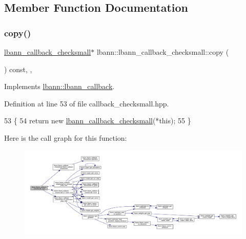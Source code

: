 \subsection{Member Function Documentation}
\mbox{\label{classlbann_1_1lbann__callback__checksmall_ae0601cd90b165049063783d4d501ffde}} 
\subsubsection{\texorpdfstring{copy()}{copy()}}
{\footnotesize\ttfamily \hyperlink{classlbann_1_1lbann__callback__checksmall}{lbann\+\_\+callback\+\_\+checksmall}$\ast$ lbann\+::lbann\+\_\+callback\+\_\+checksmall\+::copy (\begin{DoxyParamCaption}{ }\end{DoxyParamCaption}) const\hspace{0.3cm}{\ttfamily [inline]}, {\ttfamily [override]}, {\ttfamily [virtual]}}



Implements \hyperlink{classlbann_1_1lbann__callback_a9f545d1269a8c7af335625d049691f26}{lbann\+::lbann\+\_\+callback}.



Definition at line 53 of file callback\+\_\+checksmall.\+hpp.


\begin{DoxyCode}
53                                                    \{
54     \textcolor{keywordflow}{return} \textcolor{keyword}{new} \hyperlink{classlbann_1_1lbann__callback__checksmall_a2a5769a9309807f6952212d5ea3a4466}{lbann\_callback\_checksmall}(*\textcolor{keyword}{this});
55   \}
\end{DoxyCode}
Here is the call graph for this function\+:\nopagebreak
\begin{figure}[H]
\begin{center}
\leavevmode
\includegraphics[width=350pt]{classlbann_1_1lbann__callback__checksmall_ae0601cd90b165049063783d4d501ffde_cgraph}
\end{center}
\end{figure}
\mbox{\label{classlbann_1_1lbann__callback__checksmall_afe78f539ba3b2ad3e6ae8c468850052c}} 
